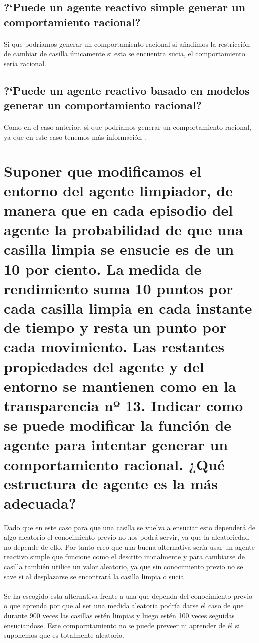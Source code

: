 \documentclass[10pt, a4paper,spanish]{article}
\begin{document}
		\subsection{?`Puede un agente reactivo simple generar un comportamiento racional?}

			\paragraph{}
			Si que podríamos generar un comportamiento racional si añadimos la restricción de cambiar de casilla únicamente si esta se encuentra sucia, el comportamiento sería racional.


		\subsection{?`Puede un agente reactivo basado en modelos generar un comportamiento racional?}

			\paragraph{}
			Como en el caso anterior, si que podríamos generar un comportamiento racional, ya que en este caso tenemos más información .



	\section{Suponer que modificamos el entorno del agente limpiador, de manera que en cada episodio del agente la probabilidad de que una casilla limpia se ensucie es de un 10 por ciento. La medida de rendimiento suma 10 puntos por cada casilla limpia en cada instante de tiempo y resta un punto por cada movimiento. Las restantes propiedades del agente y del entorno se mantienen como en la transparencia nº 13. Indicar como se puede modificar la función de agente para intentar generar un comportamiento racional. ¿Qué estructura de agente es la más adecuada?}

		\paragraph{}
		Dado que en este caso para que una casilla se vuelva a ensuciar esto dependerá de algo aleatorio el conocimiento previo no nos podrá servir, ya que la aleatoriedad no depende de ello. Por tanto creo que una buena alternativa sería usar un agente reactivo simple que funcione como el descrito inicialmente y para cambiarse de casilla también utilice un valor aleatorio, ya que sin conocimiento previo no se save si al desplazarse se encontrará la casilla limpia o sucia.

		\paragraph{}
		Se ha escogido esta alternativa frente a una que dependa del conocimiento previo o que aprenda por que al ser una medida aleatoría podría darse el caso de que durante 900 veces las casillas estén limpias y luego estén 100 veces seguidas ensuciandose. Este comporntamiento no se puede preveer ni aprender de él si suponemos que es totalmente aleatorio.
\end{document}
